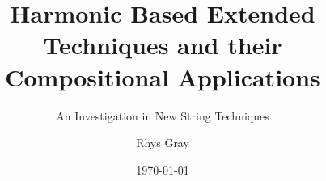 \documentclass{turabian-thesis}
\title{Harmonic Based Extended Techniques and their Compositional Applications}
\subtitle{An Investigation in New String Techniques}
\author{Rhys Gray}
\date{\today}
\begin{document}
\frontmatter{}
\maketitle



\tableofcontents{}
\listofillustrations{}

\mainmatter{}







\backmatter{}

\begin{appendixes}
    
    
    
    
    
\end{appendixes}

\printbibliography{}
\end{document}
